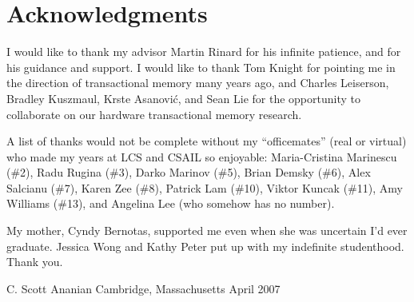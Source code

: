 \clearpage
\section*{Acknowledgments}

I would like to thank my advisor Martin Rinard for his infinite
patience, and for his guidance and support.  I would like to thank Tom
Knight for pointing me in the direction of transactional memory many
years ago, and Charles Leiserson, Bradley Kuszmaul, Krste Asanovi\'c,
and Sean Lie for the opportunity to collaborate on our
hardware transactional memory research.

A list of thanks would not be complete without
my ``officemates'' (real or virtual) who made my
years at LCS and CSAIL so enjoyable: Maria-Cristina Marinescu (\#2),
Radu Rugina (\#3), Darko Marinov (\#5), Brian Demsky (\#6), Alex
Salcianu (\#7), Karen Zee (\#8), Patrick Lam (\#10), Viktor Kuncak (\#11), 
Amy Williams (\#13), and Angelina Lee (who somehow has no number).

My mother, Cyndy Bernotas, supported me even when she was uncertain
I'd ever graduate.  Jessica Wong and Kathy Peter put up with my
indefinite studenthood.  Thank you.

\begin{flushright}
C. Scott Ananian\tight
Cambridge, Massachusetts\tight
April 2007
\end{flushright}

